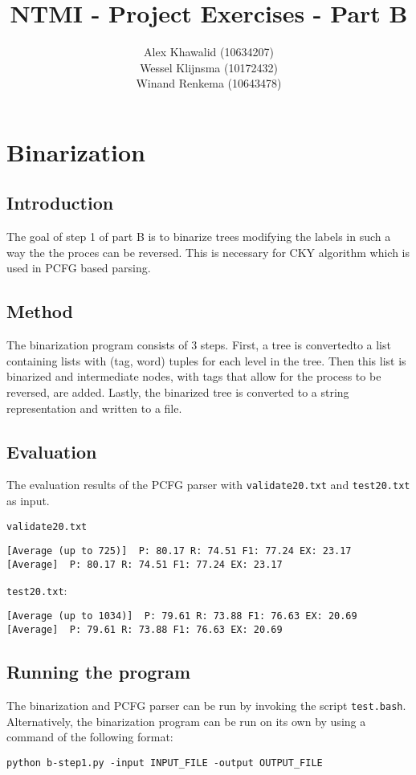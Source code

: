 \documentclass[a4paper, 10pt]{article}
\title{NTMI - Project Exercises - Part B}
\author{Alex Khawalid (10634207)\\
Wessel Klijnsma (10172432)\\
Winand Renkema (10643478)\\
}
\begin{document}
\maketitle

\section{Binarization}
\subsection{Introduction}
The goal of step 1 of part B is to binarize trees modifying the labels in such a way the the proces can be reversed. This is necessary for CKY algorithm which is used in PCFG based parsing. 

\subsection{Method}
The binarization program consists of 3 steps. First, a tree is convertedto  a list containing lists with (tag, word) tuples for each level in the tree. Then this list is binarized and intermediate nodes, with tags that allow for the process to be reversed, are added. Lastly, the binarized tree is converted to a string representation and written to a file.

\subsection{Evaluation}
The evaluation results of the PCFG parser with \texttt{validate20.txt} and \texttt{test20.txt} as input.

\texttt{validate20.txt}
\begin{verbatim}
[Average (up to 725)]  P: 80.17 R: 74.51 F1: 77.24 EX: 23.17
[Average]  P: 80.17 R: 74.51 F1: 77.24 EX: 23.17
\end{verbatim}


\texttt{test20.txt}:
\begin{verbatim}
[Average (up to 1034)]  P: 79.61 R: 73.88 F1: 76.63 EX: 20.69
[Average]  P: 79.61 R: 73.88 F1: 76.63 EX: 20.69
\end{verbatim}

\subsection{Running the program}
The binarization and PCFG parser can be run by invoking the script \texttt{test.bash}. 
Alternatively, the binarization program can be run on its own by using a command of the following format:

\begin{lstlisting}[breaklines]
python b-step1.py -input INPUT_FILE -output OUTPUT_FILE
\end{lstlisting}
\end{document}
